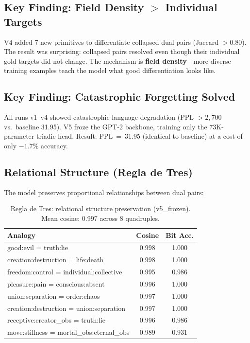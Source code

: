 \documentclass[11pt, a4paper]{article}
\begin{document}
\subsection{Key Finding: Field Density $>$ Individual Targets}

V4 added 7 new primitives to differentiate collapsed dual pairs (Jaccard $> 0.80$). The result was surprising: collapsed pairs resolved even though their individual gold targets did not change. The mechanism is \textbf{field density}---more diverse training examples teach the model what good differentiation looks like.

\subsection{Key Finding: Catastrophic Forgetting Solved}

All runs v1--v4 showed catastrophic language degradation (PPL $> 2{,}700$ vs.\ baseline 31.95). V5 froze the GPT-2 backbone, training only the 73K-parameter triadic head. Result: PPL~=~31.95 (identical to baseline) at a cost of only $-1.7\%$ accuracy.

\subsection{Relational Structure (Regla de Tres)}

The model preserves proportional relationships between dual pairs:

\begin{table}[ht]
\centering
\small
\begin{tabular}{lcc}
\toprule
\textbf{Analogy} & \textbf{Cosine} & \textbf{Bit Acc.} \\
\midrule
good:evil = truth:lie                    & 0.998 & 1.000 \\
creation:destruction = life:death        & 0.998 & 1.000 \\
freedom:control = individual:collective  & 0.995 & 0.986 \\
pleasure:pain = conscious:absent         & 0.996 & 1.000 \\
union:separation = order:chaos           & 0.997 & 1.000 \\
creation:destruction = union:separation  & 0.997 & 1.000 \\
receptive:creator\_obs = truth:lie       & 0.996 & 0.986 \\
move:stillness = mortal\_obs:eternal\_obs & 0.989 & 0.931 \\
\bottomrule
\end{tabular}
\caption{Regla de Tres: relational structure preservation (v5\_frozen). Mean cosine: 0.997 across 8 quadruples.}
\label{tab:r3}
\end{table}
\end{document}
